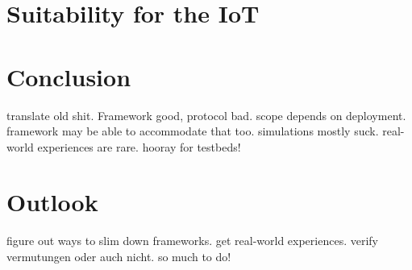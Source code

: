 \documentclass[a4paper,10pt]{scrartcl}
\begin{document}
\section{Suitability for the IoT}
\label{sec:suitability}

\section{Conclusion}
\label{sec:conclusion}
translate old shit. Framework good, protocol bad. scope depends on deployment. framework may be able to accommodate that too. simulations mostly suck. real-world experiences are rare. hooray for testbeds!

\section{Outlook}
\label{sec:outlook}
figure out ways to slim down frameworks.
get real-world experiences. verify vermutungen oder auch nicht. so much to do!

\printglossaries

{\small


}
\end{document}
